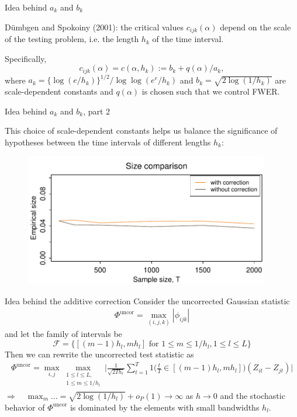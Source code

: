 \documentclass[10pt, handout]{beamer}
\begin{document}
\begin{frame}[label = frame_scaleconstants]{Idea behind $a_k$ and $b_k$}

D{\"u}mbgen and Spokoiny (2001): the critical values $c_{ijk}(\alpha)$ depend on the scale of the testing problem, i.e. the length $h_k$ of the time interval.\pause 

Specifically, 
\[c_{ijk}(\alpha) = c(\alpha,h_k) := b_k + q(\alpha)/a_k,\] where $a_k = \{\log(e/h_k)\}^{1/2} / \log \log(e^e / h_k)$ and $b_k = \sqrt{2 \log(1/h_k)}$ are scale-dependent constants and $q(\alpha)$ is chosen such that we control FWER.
\end{frame}

\begin{frame}{Idea behind $a_k$ and $b_k$, part 2}

This choice of scale-dependent constants helps us balance the significance of hypotheses between the time intervals of different lengths $h_k$:

\begin{figure}
    		\centering
	\includegraphics[width=0.95\textwidth]{plots/size_with_correction}
\end{figure}


\hyperlink{frame_critval<4>}{}
\end{frame}



\begin{frame}{Idea behind the additive correction}
Consider the uncorrected Gaussian statistic
\begin{align*}
\Phi^{\text{uncor}} = \max_{(i,j,k)} |\phi_{ijk}|
\end{align*}\pause
and let the family of intervals be \[\mathcal{F} = \big\{[(m-1) h_l, m h_l] \text{ for } 1\le m \le 1/h_l, 1 \le l \le L\big\}\]\pause
Then we can rewrite the uncorrected test statistic as
\begin{align*}
\Phi^{\text{uncor}} = \max_{i, j} \max_{\substack{1 \le l \le L, \\ 1\le m \le 1/h_l}} \Big|\frac{1}{\sqrt{2 T h_l}} \sum\limits_{t=1}^T 1 \Big( \frac{t}{T} \in [(m-1) h_l, m h_l] \Big) (Z_{it} - Z_{jt})\Big|
\end{align*}\pause
$\Rightarrow \quad \max_m \ldots =\sqrt{2\log(1/h_l)} + o_P(1) \to \infty$ as $h \to 0$ and the stochastic behavior of $\Phi^{\text{uncor}}$ is dominated by the elements with small bandwidths $h_l$. \hyperlink{frame_test<4>}{}
\end{frame}
\end{document}
